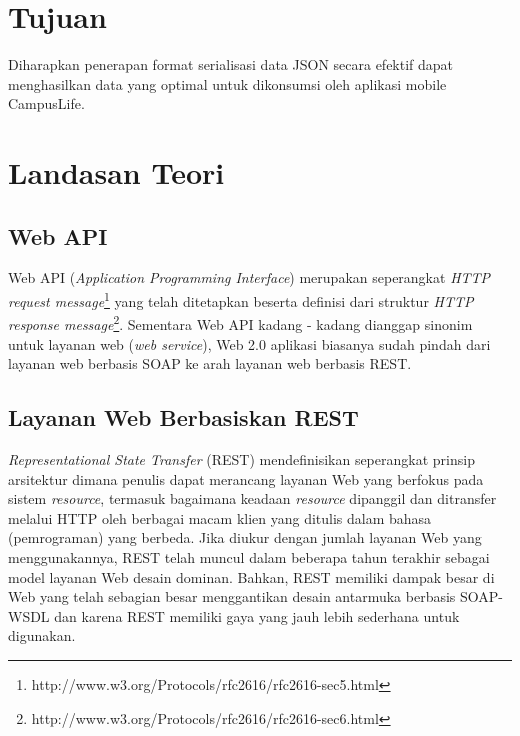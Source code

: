 \documentclass[a4paper, 12pt]{report}
\begin{document}
\section*{Tujuan}
\onehalfspacing
Diharapkan penerapan format serialisasi data JSON secara efektif dapat menghasilkan data yang optimal untuk dikonsumsi oleh aplikasi mobile CampusLife.

\section*{Landasan Teori}
\subsection*{Web API}
\onehalfspacing Web API (\textit{Application Programming Interface}) merupakan seperangkat \textit{HTTP request message}\footnote{http://www.w3.org/Protocols/rfc2616/rfc2616-sec5.html} yang telah ditetapkan beserta definisi dari struktur \textit{HTTP response message}\footnote{http://www.w3.org/Protocols/rfc2616/rfc2616-sec6.html}. Sementara Web API kadang - kadang dianggap sinonim untuk layanan web (\textit{web service}), Web 2.0 aplikasi biasanya sudah pindah dari layanan web berbasis SOAP ke arah layanan web berbasis REST\cite{web-api}\cite{rest-soap}.

\subsection*{Layanan Web Berbasiskan REST}
\onehalfspacing \textit{Representational State Transfer} (REST) mendefinisikan seperangkat prinsip arsitektur dimana penulis dapat merancang layanan Web yang berfokus pada sistem \textit{resource}, termasuk bagaimana keadaan \textit{resource} dipanggil dan ditransfer melalui HTTP oleh berbagai macam klien yang ditulis dalam bahasa (pemrograman) yang berbeda. Jika diukur dengan jumlah layanan Web yang menggunakannya, REST telah muncul dalam beberapa tahun terakhir sebagai model layanan Web desain dominan. Bahkan, REST memiliki dampak besar di Web yang telah sebagian besar menggantikan desain antarmuka berbasis SOAP-WSDL dan karena REST memiliki gaya yang jauh lebih sederhana untuk digunakan\cite{ws-restful}.
\end{document}
